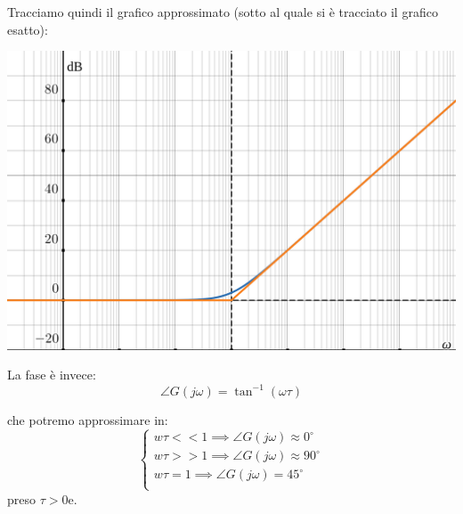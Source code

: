 \documentclass[a4paper,11pt]{article}
\begin{document}
\par\medskip

\noindent
\begin{minipage}{\textwidth}
Tracciamo quindi il grafico approssimato (sotto al quale si è tracciato il grafico esatto):
\begin{center}
	\includegraphics[scale=0.3]{../figures/rdifferentiator_bode/mod.png}
\end{center}
\end{minipage}

\par\medskip

La fase è invece:
$$
\angle G(j \omega) = \tan^{-1} (\omega \tau)
$$

che potremo approssimare in:
\[
	\begin{cases}
		w \tau << 1 \implies \angle G(j\omega) \approx 0^\circ \\ 	
		w \tau >> 1 \implies \angle G(j\omega) \approx 90^\circ \\ 	
		w \tau = 1 \implies \angle G(j\omega) = 45^\circ \\ 	
	\end{cases}
\]
preso $\tau > 0$e.

\par\medskip
\end{document}
